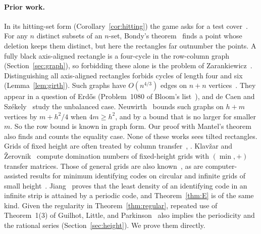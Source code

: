\paragraph{Prior work.} In its hitting-set form (Corollary~\ref{cor:hitting}) the game
asks for a test cover~\cite{katona1966,moretshapiro1985,bellitto2018,foucaud2015}.
For any $n$ distinct subsets of an $n$-set, Bondy's theorem~\cite{bondy1972} finds a
point whose deletion keeps them distinct, but here the rectangles far outnumber the points.
A fully black axis-aligned rectangle is a four-cycle in the row-column graph
(Section~\ref{sec:graph}), so forbidding these alone is the problem of
Zarankiewicz~\cite{reiman1958}. Distinguishing all axis-aligned rectangles forbids cycles
of length four and six
(Lemma~\ref{lem:girth}). Such graphs have $O(n^{4/3})$ edges on $n+n$
vertices~\cite{bondysimonovits1974}. They appear in a question of Erd\H{o}s
(Problem~1080 of Bloom's list~\cite{erdos1080}), and de Caen and
Sz\'ekely~\cite{decaenszekely1992,decaenszekely1997} study the unbalanced case.
Neuwirth~\cite[Theorem~1(ii) and Proposition~17]{neuwirth2001} bounds such graphs on
$h+m$ vertices by $m+h^2/4$ when $4m\ge h^2$, and by a bound that is no larger for
smaller $m$. So the row bound is known in graph form. Our proof with Mantel's
theorem~\cite{mantel1907} also finds and counts the equality case. None of these
works sees tilted rectangles. Grids of fixed height are often
treated by column transfer~\cite{euler2005,mertens2024,alanko2011},
\cite[Proposition~V.6]{flajolet2009}. Klav\v{z}ar and \v{Z}erovnik~\cite{klavzar1996} compute
domination numbers of fixed-height grids with $(\min,+)$ transfer matrices. Those of general
grids are also known~\cite{goncalves2011}, as are computer-assisted results for minimum
identifying codes on circular and infinite grids of small height~\cite{bouznif2019}.
Jiang~\cite{jiang2018} proves that the least
density of an identifying code in an infinite strip is attained by a periodic code, and
Theorem~\ref{thm:E} is of the same kind. Given the regularity in Theorem~\ref{thm:regular}, repeated use of
Theorem~1(3) of Guilhot, Little, and Parkinson~\cite{glp2025} also implies the periodicity and the
rational series (Section~\ref{sec:height}). We prove them directly.
